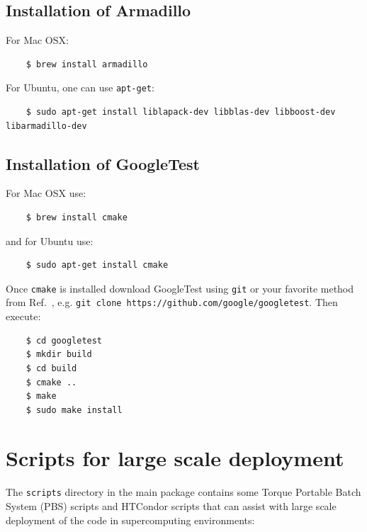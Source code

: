 \documentclass[times,sort&compress,final]{elsarticle}
\begin{document}
\subsection{Installation of Armadillo}
\label{subsec:installarmadillo}

\vspace{2mm}

For Mac OSX:
%
\begin{verbatim}
    $ brew install armadillo
\end{verbatim}
%
For Ubuntu, one can use {\tt apt-get}:
%
\begin{verbatim}
    $ sudo apt-get install liblapack-dev libblas-dev libboost-dev libarmadillo-dev
\end{verbatim}

\subsection{Installation of GoogleTest}
\label{subsec:installgtest}

\vspace{2mm}

For Mac OSX use:
%
\begin{verbatim}
    $ brew install cmake
\end{verbatim}
%
and for Ubuntu use:
%
\begin{verbatim}
    $ sudo apt-get install cmake
\end{verbatim}
%
Once {\tt cmake} is installed download GoogleTest using {\tt git} or your favorite method from Ref.~\cite{Googletest}, e.g. {\tt git clone https://github.com/google/googletest}.  Then execute:
%
\begin{verbatim}
    $ cd googletest
    $ mkdir build
    $ cd build
    $ cmake ..
    $ make
    $ sudo make install
\end{verbatim}

\section{Scripts for large scale deployment}
\label{sec:scripts}

The {\tt scripts} directory in the main package contains some Torque Portable Batch System (PBS) \cite{openpbs} scripts and HTCondor \cite{condor} scripts that can assist with large scale deployment of the code in supercomputing environments:
\end{document}
